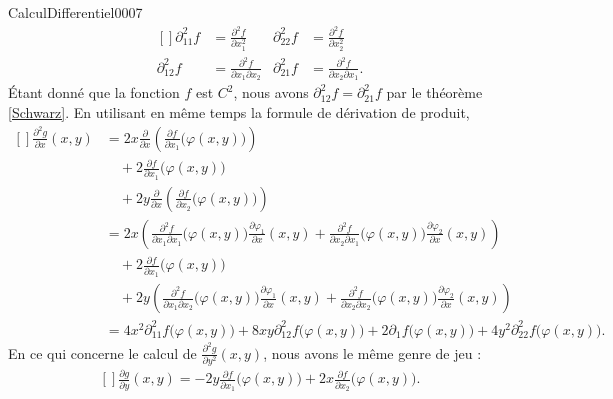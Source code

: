 \begin{corrige}{CalculDifferentiel0007}
\begin{equation}
\begin{aligned}[]
			\partial^2_{11}f&=\frac{ \partial^2f }{ \partial x_1^2}&\partial^2_{22}f&=\frac{ \partial^2f }{ \partial x_2^2 }\\
			\partial^2_{12}f&=\frac{ \partial^2f }{ \partial x_1\partial x_2}&\partial^2_{21}f&=\frac{ \partial^2f }{ \partial x_2\partial x_1 }.
		\end{aligned}
	\end{equation}
	Étant donné que la fonction $f$ est $C^2$, nous avons $\partial^2_{12}f=\partial^2_{21}f$ par le théorème \ref{Schwarz}. En utilisant en même temps la formule de dérivation de produit,
	\begin{equation}
		\begin{aligned}[]
			\frac{ \partial^2g }{ \partial  x}(x,y)&=2x\frac{ \partial  }{ \partial x }\left( \frac{ \partial f }{ \partial x_1 }\big( \varphi(x,y) \big) \right)\\
			&\quad+2\frac{ \partial f }{ \partial x_1 }\big( \varphi(x,y) \big)\\
			&\quad+2y\frac{ \partial  }{ \partial x }\left( \frac{ \partial f }{ \partial x_2 }\big( \varphi(x,y) \big) \right)\\
			&=2x\left( \frac{ \partial^2f }{ \partial x_1\partial x_1 }\big( \varphi(x,y) \big)\frac{ \partial \varphi_1 }{ \partial x }(x,y)+\frac{ \partial^2f }{ \partial x_2\partial x_1 }\big( \varphi(x,y) \big)\frac{ \partial \varphi_2 }{ \partial x }(x,y)      \right)\\
			&\quad +2\frac{ \partial f }{ \partial x_1 }\big( \varphi(x,y) \big)\\
			&\quad +2y\left( \frac{ \partial^2f }{ \partial x_1\partial x_2 }\big( \varphi(x,y) \big)\frac{ \partial \varphi_1 }{ \partial x }(x,y)+\frac{ \partial^2f }{ \partial x_2\partial x_2 }\big( \varphi(x,y) \big)\frac{ \partial \varphi_2 }{ \partial x }(x,y)       \right)\\
			&=4x^2\partial^2_{11}f\big( \varphi(x,y) \big)+8xy\partial^2_{12}f\big( \varphi(x,y) \big)+2\partial_1f\big( \varphi(x,y) \big)+4y^2\partial^2_{22}f\big( \varphi(x,y) \big).
		\end{aligned}
	\end{equation}
	En ce qui concerne le calcul de $\frac{ \partial^2g }{ \partial y^2 }(x,y)$, nous avons le même genre de jeu :
	\begin{equation}
		\begin{aligned}[]
			\frac{ \partial g }{ \partial y }(x,y)=-2y\frac{ \partial f }{ \partial x_1 }\big( \varphi(x,y) \big)+2x\frac{ \partial f }{ \partial x_2 }\big( \varphi(x,y) \big).

\end{aligned}
\end{equation}
\end{corrige}
